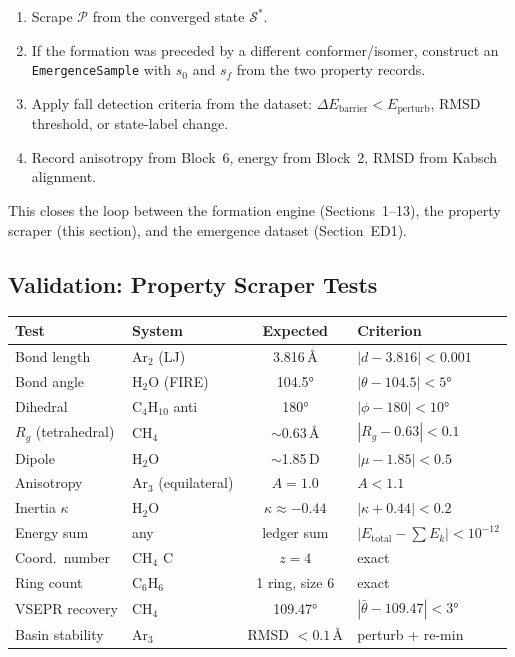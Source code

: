 \documentclass[11pt, a4paper, oneside]{article}
\theoremstyle{definition}
\theoremstyle{remark}
\begin{document}
\begin{enumerate}
\item Scrape $\mathcal{P}$ from the converged state $\mathcal{S}^*$.
\item If the formation was preceded by a different conformer/isomer,
      construct an \texttt{EmergenceSample} with $s_0$ and $s_f$ from
      the two property records.
\item Apply fall detection criteria from the dataset:
      $\Delta E_{\text{barrier}} < E_{\text{perturb}}$, RMSD threshold,
      or state-label change.
\item Record anisotropy from Block~6, energy from Block~2, RMSD from
      Kabsch alignment.
\end{enumerate}

This closes the loop between the formation engine (Sections~1--13),
the property scraper (this section), and the emergence dataset
(Section~ED1).

\subsection{Validation: Property Scraper Tests}
\label{sec:scraper-validation}

\begin{center}
\begin{tabular}{llcl}
\toprule
Test & System & Expected & Criterion \\
\midrule
Bond length & Ar$_2$ (LJ) & 3.816\,\AA & $|d - 3.816| < 0.001$ \\
Bond angle & H$_2$O (FIRE) & 104.5° & $|\theta - 104.5| < 5°$ \\
Dihedral & C$_4$H$_{10}$ anti & 180° & $|\phi - 180| < 10°$ \\
$R_g$ (tetrahedral) & CH$_4$ & $\sim$0.63\,\AA & $|R_g - 0.63| < 0.1$ \\
Dipole & H$_2$O & $\sim$1.85\,D & $|\mu - 1.85| < 0.5$ \\
Anisotropy & Ar$_3$ (equilateral) & $A = 1.0$ & $A < 1.1$ \\
Inertia $\kappa$ & H$_2$O & $\kappa \approx -0.44$ & $|\kappa + 0.44| < 0.2$ \\
Energy sum & any & ledger sum & $|E_{\text{total}} - \sum E_k| < 10^{-12}$ \\
Coord.\ number & CH$_4$ C & $z = 4$ & exact \\
Ring count & C$_6$H$_6$ & 1 ring, size 6 & exact \\
VSEPR recovery & CH$_4$ & 109.47° & $|\bar\theta - 109.47| < 3°$ \\
Basin stability & Ar$_3$ & RMSD $< 0.1$\,\AA & perturb + re-min \\
\bottomrule
\end{tabular}
\end{center}
\end{document}
